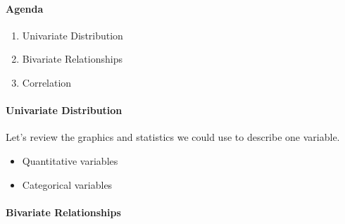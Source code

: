 \documentclass[10pt]{article}\usepackage[]{graphicx}\usepackage[]{color}
\begin{document}
\paragraph{Agenda}
\begin{enumerate}
  \itemsep0em
  \item Univariate Distribution
  \item Bivariate Relationships
  \item Correlation
\end{enumerate}

\paragraph{Univariate Distribution}

Let's review the graphics and statistics we could use to describe one variable.
\begin{itemize}
\itemsep5em
\item Quantitative variables
\item Categorical variables
\end{itemize}
\vspace{5em}

\paragraph{Bivariate Relationships}
\end{document}
